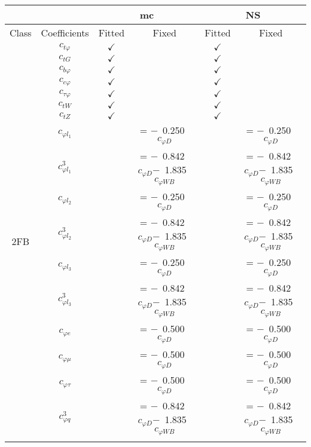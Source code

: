 \documentclass{article}
\begin{document}
\begin{table}[H]
\centering
\begin{tabular}{|c|c|c|c|c|c|}
\hline
 &  & \multicolumn{2}{c|}{mc}  & \multicolumn{2}{c|}{NS}  \\ \hline
Class & Coefficients & Fitted & Fixed  & Fitted & Fixed  \\ \hline
\multirow{24}{*}{2FB}
 & $c_{t \varphi}$ & $\checkmark$ &  & $\checkmark$ & \\ \cline{2-6}
 & $c_{tG}$ & $\checkmark$ &  & $\checkmark$ & \\ \cline{2-6}
 & $c_{b \varphi}$ & $\checkmark$ &  & $\checkmark$ & \\ \cline{2-6}
 & $c_{c \varphi}$ & $\checkmark$ &  & $\checkmark$ & \\ \cline{2-6}
 & $c_{\tau \varphi}$ & $\checkmark$ &  & $\checkmark$ & \\ \cline{2-6}
 & $c_{tW}$ & $\checkmark$ &  & $\checkmark$ & \\ \cline{2-6}
 & $c_{tZ}$ & $\checkmark$ &  & $\checkmark$ & \\ \cline{2-6}
 & $c_{\varphi l_1}$ & & = $-$\ 0.250\ $c_{\varphi D}$ & & = $-$\ 0.250\ $c_{\varphi D}$\\ \cline{2-6}
 & $c_{\varphi l_1}^{3}$ & & = $-$\ 0.842\ $c_{\varphi D}$$-$\ 1.835\ $c_{\varphi WB}$ & & = $-$\ 0.842\ $c_{\varphi D}$$-$\ 1.835\ $c_{\varphi WB}$\\ \cline{2-6}
 & $c_{\varphi l_2}$ & & = $-$\ 0.250\ $c_{\varphi D}$ & & = $-$\ 0.250\ $c_{\varphi D}$\\ \cline{2-6}
 & $c_{\varphi l_2}^{3}$ & & = $-$\ 0.842\ $c_{\varphi D}$$-$\ 1.835\ $c_{\varphi WB}$ & & = $-$\ 0.842\ $c_{\varphi D}$$-$\ 1.835\ $c_{\varphi WB}$\\ \cline{2-6}
 & $c_{\varphi l_3}$ & & = $-$\ 0.250\ $c_{\varphi D}$ & & = $-$\ 0.250\ $c_{\varphi D}$\\ \cline{2-6}
 & $c_{\varphi l_3}^{3}$ & & = $-$\ 0.842\ $c_{\varphi D}$$-$\ 1.835\ $c_{\varphi WB}$ & & = $-$\ 0.842\ $c_{\varphi D}$$-$\ 1.835\ $c_{\varphi WB}$\\ \cline{2-6}
 & $c_{\varphi e}$ & & = $-$\ 0.500\ $c_{\varphi D}$ & & = $-$\ 0.500\ $c_{\varphi D}$\\ \cline{2-6}
 & $c_{\varphi \mu}$ & & = $-$\ 0.500\ $c_{\varphi D}$ & & = $-$\ 0.500\ $c_{\varphi D}$\\ \cline{2-6}
 & $c_{\varphi \tau}$ & & = $-$\ 0.500\ $c_{\varphi D}$ & & = $-$\ 0.500\ $c_{\varphi D}$\\ \cline{2-6}
 & $c_{\varphi q}^{3}$ & & = $-$\ 0.842\ $c_{\varphi D}$$-$\ 1.835\ $c_{\varphi WB}$ & & = $-$\ 0.842\ $c_{\varphi D}$$-$\ 1.835\ $c_{\varphi WB}$\\ \cline{2-6}

\end{tabular}
\end{table}
\end{document}
